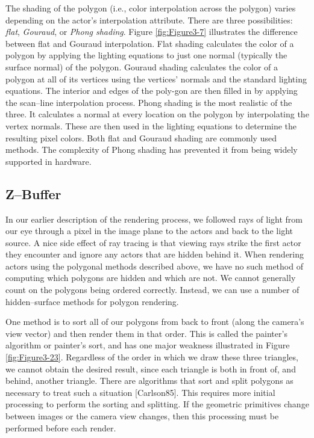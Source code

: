 The shading of the polygon (i.e., color interpolation across the polygon) varies depending on the actor's interpolation attribute. \label{subsection:rasterization.phong}
There are three possibilities: \emph{flat}, \emph{Gouraud}, or \emph{Phong shading}. Figure \ref{fig:Figure3-7} illustrates the difference between flat and Gouraud interpolation. Flat shading calculates the color of a polygon by applying the lighting equations to just one normal (typically the surface normal) of the polygon. Gouraud shading calculates the color of a polygon at all of its vertices using the vertices' normals and the standard lighting equations. The interior and edges of the poly-gon are then filled in by applying the scan--line interpolation process. Phong shading is the most realistic of the three. It calculates a normal at every location on the polygon by interpolating the vertex normals. These are then used in the lighting equations to determine the resulting pixel colors. Both flat and Gouraud shading are commonly used methods. The complexity of Phong shading has prevented it from being widely supported in hardware.

\subsection{Z--Buffer}
\label{Z--Buffer}

In our earlier description of the rendering process, we followed rays of light from our eye through a pixel in the image plane to the actors and back to the light source. A nice side effect of ray tracing is that viewing rays strike the first actor they encounter and ignore any actors that are hidden behind it. When rendering actors using the polygonal methods described above, we have no such method of computing which polygons are hidden and which are not. We cannot generally count on the polygons being ordered correctly. Instead, we can use a number of hidden--surface methods for polygon rendering.

One method is to sort all of our polygons from back to front (along the camera's view vector) and then render them in that order. This is called the painter's algorithm or painter's sort, and has one major weakness illustrated in Figure \ref{fig:Figure3-23}. Regardless of the order in which we draw these three triangles, we cannot obtain the desired result, since each triangle is both in front of, and behind, another triangle. There are algorithms that sort and split polygons as necessary to treat such a situation [Carlson85]. This requires more initial processing to perform the sorting and splitting. If the geometric primitives change between images or the camera view changes, then this processing must be performed before each render.

